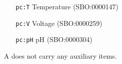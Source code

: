 \begin{glyphDescription}
\begin{center}
  \begin{itemize}\setlength{\parskip}{0ex}
  \item[\texttt{pc:T}] Temperature (SBO:0000147)
  \item[\texttt{pc:V}] Voltage (SBO:0000259)
  \item[\texttt{pc:pH}] pH (SBO:0000304)
  \end{itemize}
\end{center}

    
\glyphAux A  does not carry any auxiliary items.  

\end{glyphDescription}


